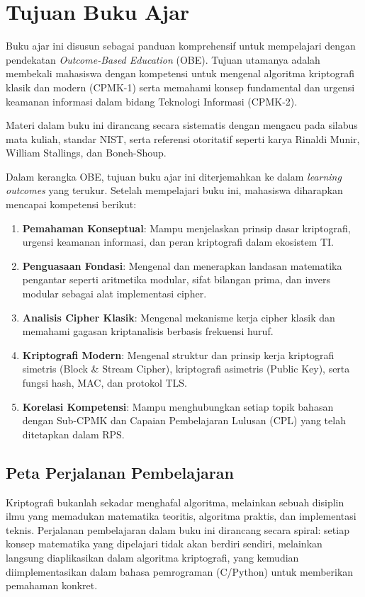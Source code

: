 \section{Tujuan Buku Ajar}

Buku ajar ini disusun sebagai panduan komprehensif untuk mempelajari  dengan pendekatan \textit{Outcome-Based Education} (OBE). Tujuan utamanya adalah membekali mahasiswa dengan kompetensi untuk mengenal algoritma kriptografi klasik dan modern (CPMK-1) serta memahami konsep fundamental dan urgensi keamanan informasi dalam bidang Teknologi Informasi (CPMK-2).

Materi dalam buku ini dirancang secara sistematis dengan mengacu pada silabus mata kuliah, standar NIST, serta referensi otoritatif seperti karya Rinaldi Munir, William Stallings, dan Boneh-Shoup.

Dalam kerangka OBE, tujuan buku ajar ini diterjemahkan ke dalam \textit{learning outcomes} yang terukur. Setelah mempelajari buku ini, mahasiswa diharapkan mencapai kompetensi berikut:
\begin{enumerate}
  \item \textbf{Pemahaman Konseptual}: Mampu menjelaskan prinsip dasar kriptografi, urgensi keamanan informasi, dan peran kriptografi dalam ekosistem TI.
  \item \textbf{Penguasaan Fondasi}: Mengenal dan menerapkan landasan matematika pengantar seperti aritmetika modular, sifat bilangan prima, dan invers modular sebagai alat implementasi cipher.
  \item \textbf{Analisis Cipher Klasik}: Mengenal mekanisme kerja cipher klasik dan memahami gagasan kriptanalisis berbasis frekuensi huruf.
  \item \textbf{Kriptografi Modern}: Mengenal struktur dan prinsip kerja kriptografi simetris (Block \& Stream Cipher), kriptografi asimetris (Public Key), serta fungsi hash, MAC, dan protokol TLS.
  \item \textbf{Korelasi Kompetensi}: Mampu menghubungkan setiap topik bahasan dengan Sub-CPMK dan Capaian Pembelajaran Lulusan (CPL) yang telah ditetapkan dalam RPS.
\end{enumerate}

\subsection{Peta Perjalanan Pembelajaran}

Kriptografi bukanlah sekadar menghafal algoritma, melainkan sebuah disiplin ilmu yang memadukan matematika teoritis, algoritma praktis, dan implementasi teknis. Perjalanan pembelajaran dalam buku ini dirancang secara spiral: setiap konsep matematika yang dipelajari tidak akan berdiri sendiri, melainkan langsung diaplikasikan dalam algoritma kriptografi, yang kemudian diimplementasikan dalam bahasa pemrograman (C/Python) untuk memberikan pemahaman konkret.

